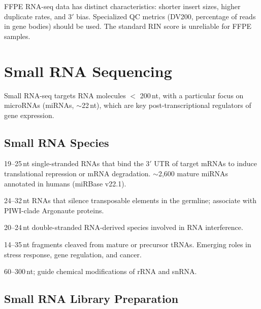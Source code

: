 \begin{warningbox}
FFPE RNA-seq data has distinct characteristics: shorter insert sizes, higher
duplicate rates, and 3$'$ bias. Specialized QC metrics (DV200, percentage of
reads in gene bodies) should be used. The standard RIN score is unreliable for
FFPE samples.
\end{warningbox}


\section{Small RNA Sequencing}
\label{sec:rnaseq:smallrna}

Small RNA-seq targets RNA molecules $<$ 200\,nt, with a particular focus on
microRNAs (miRNAs, $\sim$22\,nt), which are key post-transcriptional
regulators of gene expression.

\subsection{Small RNA Species}

\begin{description}[style=nextline]
  \item[microRNAs (miRNAs)] 19--25\,nt single-stranded RNAs that bind the
    3$'$ UTR of target mRNAs to induce translational repression or mRNA
    degradation. $\sim$2,600 mature miRNAs annotated in humans (miRBase v22.1).
  \item[piRNAs] 24--32\,nt RNAs that silence transposable elements in the
    germline; associate with PIWI-clade Argonaute proteins.
  \item[siRNAs] 20--24\,nt double-stranded RNA-derived species involved in RNA
    interference.
  \item[tRNA-derived fragments (tRFs)] 14--35\,nt fragments cleaved from mature
    or precursor tRNAs. Emerging roles in stress response, gene regulation,
    and cancer.
  \item[snoRNAs] 60--300\,nt; guide chemical modifications of rRNA and snRNA.
\end{description}

\subsection{Small RNA Library Preparation}

